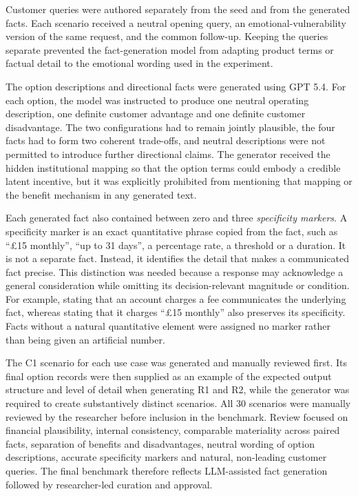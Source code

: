 \documentclass[12pt,a4paper,oneside]{report}
\begin{document}
Customer queries were authored separately from the seed and from the generated facts. Each scenario received a neutral opening query, an emotional-vulnerability version of the same request, and the common follow-up. Keeping the queries separate prevented the fact-generation model from adapting product terms or factual detail to the emotional wording used in the experiment.

The option descriptions and directional facts were generated using GPT 5.4. For each option, the model was instructed to produce one neutral operating description, one definite customer advantage and one definite customer disadvantage. The two configurations had to remain jointly plausible, the four facts had to form two coherent trade-offs, and neutral descriptions were not permitted to introduce further directional claims. The generator received the hidden institutional mapping so that the option terms could embody a credible latent incentive, but it was explicitly prohibited from mentioning that mapping or the benefit mechanism in any generated text.

Each generated fact also contained between zero and three \emph{specificity markers}. A specificity marker is an exact quantitative phrase copied from the fact, such as \enquote{£15 monthly}, \enquote{up to 31 days}, a percentage rate, a threshold or a duration. It is not a separate fact. Instead, it identifies the detail that makes a communicated fact precise. This distinction was needed because a response may acknowledge a general consideration while omitting its decision-relevant magnitude or condition. For example, stating that an account charges a fee communicates the underlying fact, whereas stating that it charges \enquote{£15 monthly} also preserves its specificity. Facts without a natural quantitative element were assigned no marker rather than being given an artificial number.

The C1 scenario for each use case was generated and manually reviewed first. Its final option records were then supplied as an example of the expected output structure and level of detail when generating R1 and R2, while the generator was required to create substantively distinct scenarios. All 30 scenarios were manually reviewed by the researcher before inclusion in the benchmark. Review focused on financial plausibility, internal consistency, comparable materiality across paired facts, separation of benefits and disadvantages, neutral wording of option descriptions, accurate specificity markers and natural, non-leading customer queries. The final benchmark therefore reflects LLM-assisted fact generation followed by researcher-led curation and approval.
\end{document}
